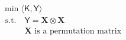 \begin{defi}
	\begin{tcolorbox}[title = Kronecker product formulation]
		\begin{equation}
		\begin{split}	
		&\min{\langle \mathsf K, \mathsf Y \rangle} \\
		&\text{ s.t.} \quad   \mathsf Y = \bm X \otimes \bm X \\
		&\phantom{\text{ s.t.}} \quad \bm X \text{ is a permutation matrix} \\
\end{split}
		\end{equation}
	\end{tcolorbox}
	
\end{defi}

\begin{comment}
\subsection{Convex and concave integer formulation}
For any $\bm A \in \R^{n \times n}$ let $\vettore(\bm A) \in \R^{n^2}$ be the vector obtained by stacking the columns of $\bm A$ on top of one other.

Using  $\tr(\bm A \bm B) = \tr{(\bm B\trasp \bm A \trasp )} $  and $\tr\left(\bm A \bm B\trasp \right) = \vettore(\bm A\trasp) \vettore(\bm B) $, the trace formulation \eqref{eq:QAP_traccia} can be rewritten as
\[
\begin{split}
\tr{\Bigl((\bm F  \bm X \bm D  \trasp+ \bm C)\bm X \trasp \Bigr)} 
&=\tr{\Bigl(\bm F   \bm X \bm D\trasp \bm X \trasp \Bigr)} + \tr{\left(\bm C \bm X \trasp \right)} \\
&=\tr{\Bigl(\bm F \trasp  \bm X \bm D \bm X \trasp \Bigr)} + \tr{\left(\bm X \bm C \trasp \right)} \\
&=\vettore(\bm X) \trasp\vettore{\left(\bm F   \bm X \bm D\trasp \right)} +\vettore(\bm C) \trasp \vettore(\bm X)  \\
&=\vettore(\bm X) \trasp \left(\bm D  \otimes \bm F\right)\vettore(\bm X) +\vettore(\bm C) \trasp \vettore(\bm X)
\end{split}
\]


Were we used in the final step
\[
\vettore{(\bm F \bm X \bm V)} = \left(\bm V\trasp \otimes \bm A\right) \vettore(\bm X)
\]

(See theorem 2, p. 35 in \textit{Matrix Differential Calculus with Applications in Statistics and Econometrics} by J. R. Magnus and H. Neudecker \cite{Magnus1999}).



\end{comment}
